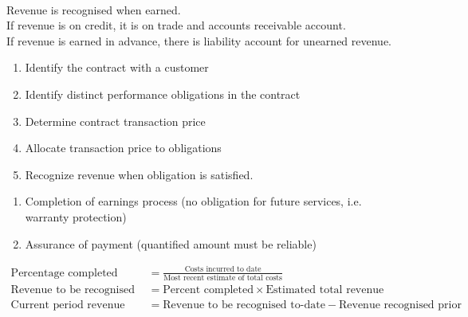 \begin{definition} \\
Revenue is recognised when earned.\\
If revenue is on credit, it is on trade and accounts receivable account.\\
If revenue is earned in advance, there is liability account for unearned revenue.
\end{definition}

\begin{method} 
\begin{enumerate}[label=\arabic*.]
\setlength{\itemsep}{0pt}
\item Identify the contract with a customer
\item Identify distinct performance obligations in the contract
\item Determine contract transaction price
\item Allocate transaction price to obligations
\item Recognize revenue when obligation is satisfied.
\end{enumerate}
\end{method}

\begin{remark} 
\begin{enumerate}[label=\roman*.]
\setlength{\itemsep}{0pt}
\item Completion of earnings process (no obligation for future services, i.e. warranty protection)
\item Assurance of payment (quantified amount must be reliable)
\end{enumerate}
\end{remark}

\begin{method} 
\begin{align}
\text{Percentage completed} &= \frac{\text{Costs incurred to date}}{\text{Most recent estimate of total costs}} \nonumber \\
\text{Revenue to be recognised to-date} &= \text{Percent completed} \times \text{Estimated total revenue} \nonumber \\
\text{Current period revenue} &= \text{Revenue to be recognised to-date} - \text{Revenue recognised prior} \nonumber
\end{align}
\end{method}

